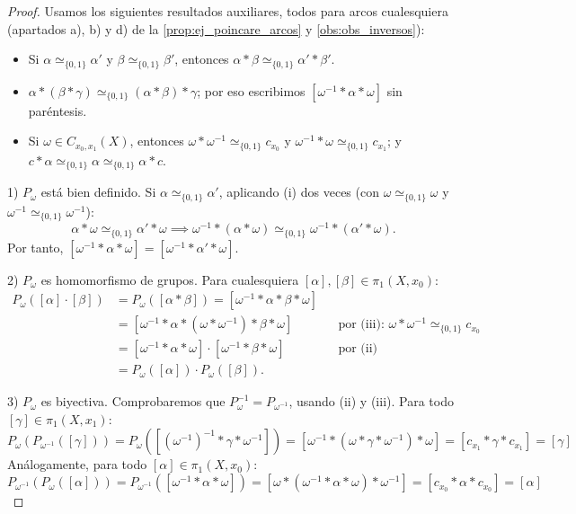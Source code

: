 \begin{proof}
Usamos los siguientes resultados auxiliares, todos para arcos cualesquiera (apartados a), b) y d) de la \cref{prop:ej_poincare_arcos} y \cref{obs:obs_inversos}):
\begin{itemize}
    \item[(i)] Si $\alpha \simeq_{\{0,1\}} \alpha'$ y $\beta \simeq_{\{0,1\}} \beta'$, entonces $\alpha * \beta \simeq_{\{0,1\}} \alpha' * \beta'$.
    \item[(ii)] $\alpha * (\beta * \gamma) \simeq_{\{0,1\}} (\alpha * \beta) * \gamma$; por eso escribimos $[\omega^{-1} * \alpha * \omega]$ sin paréntesis.
    \item[(iii)] Si $\omega \in C_{x_0,x_1}(X)$, entonces $\omega * \omega^{-1} \simeq_{\{0,1\}} c_{x_0}$ y $\omega^{-1} * \omega \simeq_{\{0,1\}} c_{x_1}$; y $c * \alpha \simeq_{\{0,1\}} \alpha \simeq_{\{0,1\}} \alpha * c$.
\end{itemize}

1) $P_\omega$ está bien definido. Si $\alpha \simeq_{\{0,1\}} \alpha'$, aplicando (i) dos veces (con $\omega \simeq_{\{0,1\}} \omega$ y $\omega^{-1} \simeq_{\{0,1\}} \omega^{-1}$):
\[ \alpha * \omega \simeq_{\{0,1\}} \alpha' * \omega \implies \omega^{-1} * (\alpha * \omega) \simeq_{\{0,1\}} \omega^{-1} * (\alpha' * \omega). \]
Por tanto, $[\omega^{-1} * \alpha * \omega] = [\omega^{-1} * \alpha' * \omega]$.

2) $P_\omega$ es homomorfismo de grupos. Para cualesquiera $[\alpha], [\beta] \in \pi_1(X, x_0)$:
\begin{align*}
P_\omega([\alpha] \cdot [\beta]) &= P_\omega([\alpha * \beta]) = [\omega^{-1} * \alpha * \beta * \omega] \\
&= [\omega^{-1} * \alpha * (\omega * \omega^{-1}) * \beta * \omega] && \text{por (iii): } \omega * \omega^{-1} \simeq_{\{0,1\}} c_{x_0} \\
&= [\omega^{-1} * \alpha * \omega] \cdot [\omega^{-1} * \beta * \omega] && \text{por (ii)} \\
&= P_\omega([\alpha]) \cdot P_\omega([\beta]).
\end{align*}

3) $P_\omega$ es biyectiva. Comprobaremos que $P_\omega^{-1} = P_{\omega^{-1}}$, usando (ii) y (iii).
Para todo $[\gamma] \in \pi_1(X, x_1)$:
\[
P_\omega(P_{\omega^{-1}}([\gamma])) = P_\omega([(\omega^{-1})^{-1} * \gamma * \omega^{-1}]) = [\omega^{-1} * (\omega * \gamma * \omega^{-1}) * \omega] = [c_{x_1} * \gamma * c_{x_1}] = [\gamma]
\]
Análogamente, para todo $[\alpha] \in \pi_1(X, x_0)$:
\[
P_{\omega^{-1}}(P_\omega([\alpha])) = P_{\omega^{-1}}([\omega^{-1} * \alpha * \omega]) = [\omega * (\omega^{-1} * \alpha * \omega) * \omega^{-1}] = [c_{x_0} * \alpha * c_{x_0}] = [\alpha]
\]
\end{proof}

